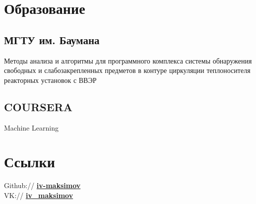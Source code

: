 \documentclass[a4paper]{resume}
\begin{document}
\begin{minipage}[t]{0.33\textwidth} %


\section{Образование} 

\subsection{МГТУ им. Баумана}


\sectionspace %

Методы анализа и алгоритмы для программного комплекса системы обнаружения свободных и слабозакрепленных предметов в контуре циркуляции теплоносителя реакторных установок с ВВЭР

\sectionspace
\subsection{COURSERA}
\vspace{\topsep}
\begin{tightitemize}
	\item Machine Learning
\end{tightitemize}



\sectionspace %



\section{Ссылки} 

Github:// \href{https://github.com/iv-maksimov}{\bf iv-maksimov} \\
VK:// \href{http://vk.com/iv\_maksimov}{\bf iv\_maksimov}


\end{minipage}
\end{document}
